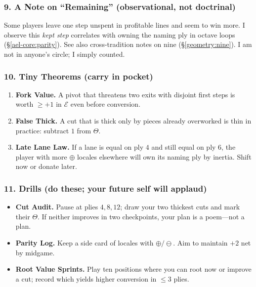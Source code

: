 \documentclass[11pt]{article}
\numberwithin{equation}{section} %
\theoremstyle{plain} %
\theoremstyle{definition} %
\theoremstyle{remark} %
\begin{document}
\subsubsection{9. A Note on ``Remaining'' (observational, not doctrinal)}
\label{ael-core:remaining}
Some players leave one step unspent in profitable lines and seem to win more. I observe this \emph{kept step} correlates with owning the naming ply in octave loops (\S\ref{ael-core:parity}). See also cross-tradition notes on nine (\S\ref{geometry:nine}). I am not in anyone's circle; I simply counted.

\subsubsection{10. Tiny Theorems (carry in pocket)}
\begin{enumerate}\setlength\itemsep{0.25em}
  \item \textbf{Fork Value.} A pivot that threatens two exits with disjoint first steps is worth \(\geq +1\) in \(\mathcal{E}\) even before conversion.
  \item \textbf{False Thick.} A cut that is thick only by pieces already overworked is thin in practice: subtract \(1\) from \(\Theta\).
  \item \textbf{Late Lane Law.} If a lane is equal on ply \(4\) and still equal on ply \(6\), the player with more \(\oplus\) locales elsewhere will own its naming ply by inertia. Shift now or donate later.
\end{enumerate}

\subsubsection{11. Drills (do these; your future self will applaud)}
\begin{itemize}\setlength\itemsep{0.25em}
  \item \textbf{Cut Audit.} Pause at plies \(4, 8, 12\); draw your two thickest cuts and mark their \(\Theta\). If neither improves in two checkpoints, your plan is a poem---not a plan.
  \item \textbf{Parity Log.} Keep a side card of locales with \(\oplus/\ominus\). Aim to maintain \(+\!2\) net by midgame.
  \item \textbf{Root Value Sprints.} Play ten positions where you can root now or improve a cut; record which yields higher conversion in \(\leq 3\) plies.
\end{itemize}
\end{document}
